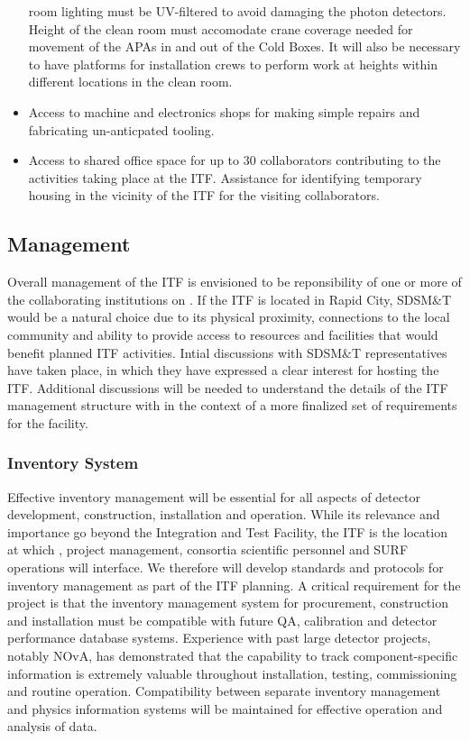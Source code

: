 \begin{itemize}
    room lighting must be UV-filtered to avoid damaging the photon detectors.
    Height of the clean room must accomodate crane coverage needed for movement 
    of the APAs in and out of the Cold Boxes.  It will also be necessary to have 
    platforms for installation crews to perform work at heights within different 
    locations in the clean room.    
  \item Access to machine and electronics shops for making simple repairs and 
    fabricating un-anticpated tooling.
  \item Access to shared office space for up to 30 collaborators contributing 
    to the activities taking place at the ITF.  Assistance for identifying 
    temporary housing in the vicinity of the ITF for the visiting collaborators.        
\end{itemize}

\subsection{Management}

Overall management of the ITF is envisioned to be reponsibility of one or 
more of the collaborating institutions on .  If the ITF is located 
in Rapid City, SDSM\&T would be a natural choice due to its physical proximity, 
connections to the local community and ability to provide access to resources 
and facilities that would benefit planned ITF activities.  Intial discussions 
with SDSM\&T representatives have taken place, in which they have expressed a 
clear interest for hosting the ITF.  Additional discussions will be needed to 
understand the details of the ITF management structure with in the context of 
a more finalized set of requirements for the facility.    

\subsubsection{Inventory System}

Effective inventory management will be essential for all aspects of
 detector development, construction, installation and
operation.  While its relevance and importance go beyond the
Integration and Test Facility, the ITF is the location at which
,  project management, consortia scientific
personnel and SURF operations will interface.  We therefore will
develop standards and protocols for inventory management as part of
the ITF planning.  A critical requirement for the project is that the
inventory management system for procurement, construction and
installation must be compatible with future QA, calibration and
detector performance database systems.  Experience with past large
detector projects, notably NOvA, has demonstrated that the capability
to track component-specific information is extremely valuable
throughout installation, testing, commissioning and routine operation.
Compatibility between separate inventory management and physics
information systems will be maintained for effective operation and
analysis of  data.
